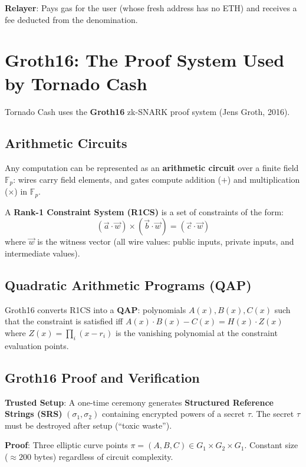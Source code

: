 \documentclass[12pt,a4paper,openany]{book}
\theoremstyle{definition}
\theoremstyle{plain}
\theoremstyle{remark}
\begin{document}
\textbf{Relayer}: Pays gas for the user (whose fresh address has no ETH)
and receives a fee deducted from the denomination.

\section{Groth16: The Proof System Used by Tornado Cash}

Tornado Cash uses the \textbf{Groth16} zk-SNARK proof system
(Jens Groth, 2016).

\subsection{Arithmetic Circuits}

Any computation can be represented as an \textbf{arithmetic circuit}
over a finite field $\mathbb{F}_p$: wires carry field elements, and
gates compute addition ($+$) and multiplication ($\times$) in
$\mathbb{F}_p$.

A \textbf{Rank-1 Constraint System (R1CS)} is a set of constraints of
the form:
\[
  (\vec{a}\cdot\vec{w})\times(\vec{b}\cdot\vec{w}) = (\vec{c}\cdot\vec{w})
\]
where $\vec{w}$ is the witness vector (all wire values: public inputs,
private inputs, and intermediate values).

\subsection{Quadratic Arithmetic Programs (QAP)}

Groth16 converts R1CS into a \textbf{QAP}: polynomials $A(x), B(x),
C(x)$ such that the constraint is satisfied iff
$A(x)\cdot B(x) - C(x) = H(x)\cdot Z(x)$ where $Z(x)=\prod_i(x-r_i)$
is the vanishing polynomial at the constraint evaluation points.

\subsection{Groth16 Proof and Verification}

\textbf{Trusted Setup}: A one-time ceremony generates
\textbf{Structured Reference Strings (SRS)} $(\sigma_1,\sigma_2)$
containing encrypted powers of a secret $\tau$.  The secret $\tau$
must be destroyed after setup (``toxic waste'').

\textbf{Proof}: Three elliptic curve points $\pi = (A, B, C) \in
G_1\times G_2\times G_1$.  Constant size ($\approx 200$ bytes)
regardless of circuit complexity.
\end{document}
